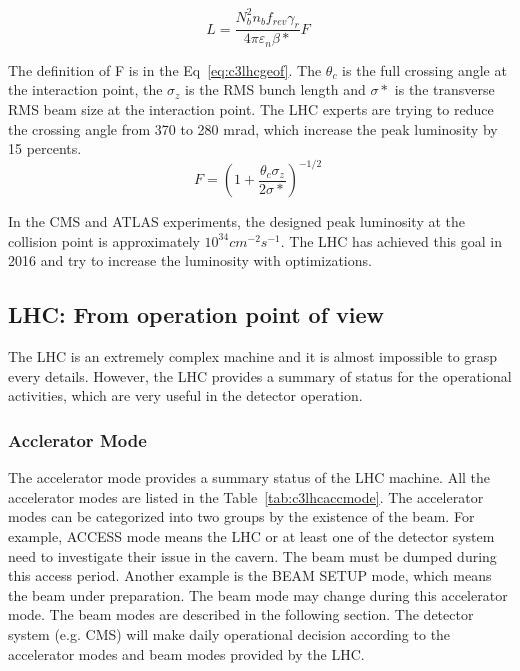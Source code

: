 \begin{equation}
 L = \frac{N^{2}_{b}n_{b}f_{rev}\gamma_{r}}{4\pi \varepsilon_{n}\beta *}F \;
 \label{eq:c3lhclumi}
\end{equation}

The definition of F is in the Eq~\ref{eq:c3lhcgeof}. The $\theta_{c}$ is the full crossing angle at the interaction point, the $\sigma_{z}$ is the RMS bunch length and $\sigma *$ is the transverse RMS beam size at the interaction point. The LHC experts are trying to reduce the crossing angle from 370 to 280 mrad, which increase the peak luminosity by 15 percents. 
\begin{equation}
 F = (1+\frac{\theta_{c}\sigma_{z}}{2\sigma *})^{-1/2} \;
 \label{eq:c3lhcgeof}
\end{equation}

In the CMS and ATLAS experiments, the designed peak luminosity at the collision point is approximately $10^{34}cm^{-2}s^{-1}$. The LHC has achieved this goal in 2016 and try to increase the luminosity with optimizations.

\subsection{LHC: From operation point of view}

The LHC is an extremely complex machine and it is almost impossible to grasp every details. However, the LHC provides a summary of status for the operational activities, which are very useful in the detector operation.

\subsubsection{Acclerator Mode}

The accelerator mode provides a summary status of the LHC machine. All the accelerator modes are listed in the Table~\ref{tab:c3lhcaccmode}. The accelerator modes can be categorized into two groups by the existence of the beam. For example, ACCESS mode means the LHC or at least one of the detector system need to investigate their issue in the cavern. The beam must be dumped during this access period. Another example is the BEAM SETUP mode, which means the beam under preparation. The beam mode may change during this accelerator mode. The beam modes are described in the following section. The detector system (e.g. CMS) will make daily operational decision according to the accelerator modes and beam modes provided by the LHC.

